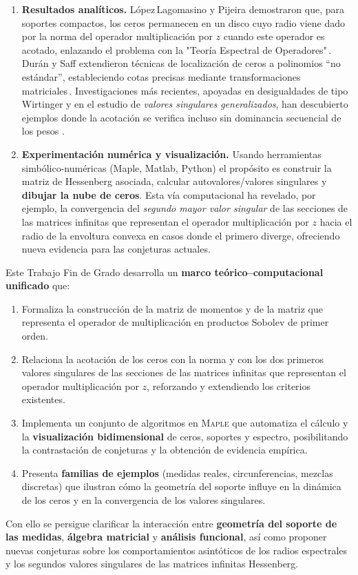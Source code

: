 \begin{enumerate}
	\item \textbf{Resultados analíticos.}
	      López\,Lagomasino y Pijeira demostraron que, para soportes compactos, los ceros permanecen en un disco cuyo radio viene dado por la norma del operador multiplicación por $z$ cuando este operador es acotado, enlazando el problema con la "Teoría Espectral de Operadores"\,\cite{lagomasino2001sobolev}.
	      Durán y Saff extendieron técnicas de localización de ceros a polinomios ``no estándar'', estableciendo cotas precisas mediante transformaciones matriciales\,\cite{DuranSaff2001}.
	      Investigaciones más recientes, apoyadas en desigualdades de tipo Wirtinger y en el estudio de \emph{valores singulares generalizados}, han descubierto ejemplos donde la acotación se verifica incluso sin dominancia secuencial de los pesos \cite{escribano2025zeros,singularValuesOfHessenbergMatrices}.
	\item \textbf{Experimentación numérica y visualización.}
	      Usando herramientas simbólico-numéricas (Maple, Matlab, Python) el propósito es construir la matriz de Hessenberg asociada, calcular autovalores/valores
	      singulares y \textbf{dibujar la nube de ceros}. Esta vía computacional
	      ha revelado, por ejemplo, la convergencia del \emph{segundo mayor valor singular} de las secciones de las matrices infinitas que representan el operador multiplicación por $z$
	      hacia el radio de la envoltura convexa en casos donde el primero diverge,
	      ofreciendo nueva evidencia para las conjeturas actuales.
\end{enumerate}

Este Trabajo Fin de Grado desarrolla un \textbf{marco teórico--computacional unificado} que:

\begin{enumerate}
	\item Formaliza la construcción de la matriz de momentos y de la matriz que representa el operador de multiplicación en productos Sobolev de primer orden.
	\item Relaciona la acotación de los ceros con la norma y con los dos primeros valores singulares de las secciones de las matrices infinitas que representan el operador multiplicación por $z$, reforzando y extendiendo los criterios existentes.
	\item Implementa un conjunto de algoritmos en \textsc{Maple} que automatiza el cálculo y la \textbf{visualización bidimensional} de ceros, soportes y espectro, posibilitando la contrastación de conjeturas y la obtención de evidencia empírica.
	\item Presenta \textbf{familias de ejemplos} (medidas reales, circunferencias, mezclas discretas) que ilustran cómo la geometría del soporte influye en la dinámica de los ceros y en la convergencia de los valores singulares.
\end{enumerate}

Con ello se persigue clarificar la interacción entre \textbf{geometría del soporte de las medidas}, \textbf{álgebra matricial} y \textbf{análisis funcional}, así como proponer nuevas conjeturas sobre los comportamientos asintóticos de los radios espectrales y los segundos valores singulares de las matrices infinitas Hessenberg.